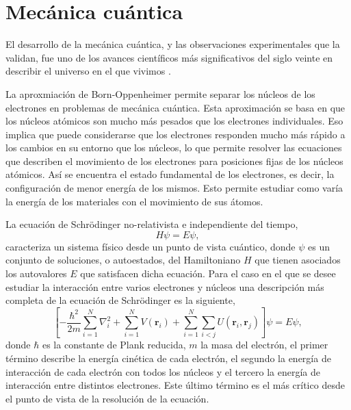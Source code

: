 \section{Mecánica cuántica}

El desarrollo de la mecánica cuántica, y las observaciones experimentales que la
validan, fue uno de los avances científicos más significativos del siglo veinte
en describir el universo en el que vivimos \cite{shankar2012}.

La aproxmiación de Born-Oppenheimer permite separar los núcleos de los electrones 
en problemas de mecánica cuántica. Esta aproximación se basa en que los núcleos 
atómicos son mucho más pesados que los electrones individuales. Eso implica que 
puede considerarse que los electrones responden mucho más rápido a los cambios en 
su entorno que los núcleos, lo que permite resolver las ecuaciones que describen 
el movimiento de los electrones para posiciones fijas de los núcleos atómicos. Así 
se encuentra el estado fundamental de los electrones, es decir, la configuración 
de menor energía de los mismos. Esto permite estudiar como varía la energía de los 
materiales con el movimiento de sus átomos.

La ecuación de Schrödinger no-relativista e independiente del tiempo,
\begin{equation}\label{eq:schrodinger}
    H \psi = E \psi,
\end{equation}
caracteriza un sistema físico desde un punto de vista cuántico, donde $\psi$ es un
conjunto de soluciones, o autoestados, del Hamiltoniano $H$ que tienen asociados los
autovalores $E$ que satisfacen dicha ecuación. Para el caso en el que se desee estudiar
la interacción entre varios electrones y núcleos una descripción más completa de la 
ecuación de Schrödinger es la siguiente,
\begin{equation}\label{eq:schrodinger}
    \left[ - \frac{\hbar^2}{2 m} \sum_{i=1}^N \nabla_i^2 + \sum_{i=1}^N V(\mathbf{r}_i) + \sum_{i=1}^N \sum_{i<j} U(\mathbf{r}_i, \mathbf{r}_j) \right] \psi = E \psi,
\end{equation}
donde $\hbar$ es la constante de Plank reducida, $m$ la masa del electrón, el primer 
término describe la energía cinética de cada electrón, el segundo la energía de 
interacción de cada electrón con todos los núcleos y el tercero la energía de 
interacción entre distintos electrones. Este último término es el más crítico desde 
el punto de vista de la resolución de la ecuación.

